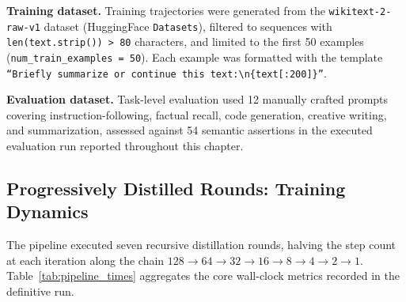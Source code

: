 \documentclass[11pt, a4paper]{article}
\begin{document}
\noindent\textbf{Training dataset.} Training trajectories were generated from the \texttt{wikitext-2-raw-v1} dataset (HuggingFace \texttt{Datasets}), filtered to sequences with \texttt{len(text.strip()) > 80} characters, and limited to the first 50 examples (\texttt{num\_train\_examples = 50}). Each example was formatted with the template \texttt{``Briefly summarize or continue this text:\textbackslash n\{text[:200]\}''}.

\noindent\textbf{Evaluation dataset.} Task-level evaluation used 12 manually crafted prompts covering instruction-following, factual recall, code generation, creative writing, and summarization, assessed against 54 semantic assertions in the executed evaluation run reported throughout this chapter. 

\subsection{Progressively Distilled Rounds: Training Dynamics}
\label{subsec:training_dynamics}

The pipeline executed seven recursive distillation rounds, halving the step count at each iteration along the chain $128 \to 64 \to 32 \to 16 \to 8 \to 4 \to 2 \to 1$. Table~\ref{tab:pipeline_times} aggregates the core wall-clock metrics recorded in the definitive run.

\begin{table}[H]
\centering
\caption{Pipeline wall-clock metrics across all distillation rounds.}
\label{tab:pipeline_times}
\end{table}
\end{document}
